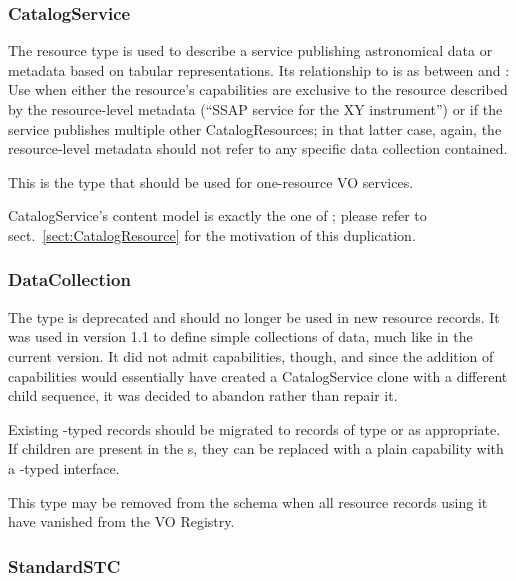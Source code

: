 \documentclass[11pt,a4paper]{ivoa}
\begin{document}


\subsubsection{CatalogService}

The  resource type is used to describe a
service publishing astronomical data or metadata based on tabular
representations.  Its relationship to 
is as between 
and : Use  when either
the resource's capabilities are exclusive to the resource described by
the resource-level metadata (``SSAP service for the XY instrument'') or
if the service publishes multiple other CatalogResources; in that latter
case, again, the resource-level metadata should not refer to any
specific data collection contained.

This is the type that should be used for one-resource VO
services.

CatalogService's content model is exactly the one of
; please refer to sect.~\ref{sect:CatalogResource}
for the motivation of this duplication.

\subsubsection{DataCollection}
\label{sect:datacollection}

The  type is deprecated and should no longer be
used in new resource records.  It was used in version 1.1 to define
simple collections of data, much like  in the
current version.  It did not admit capabilities, though, and since the
addition of capabilities would essentially have created a CatalogService
clone with a different child sequence, it was decided to abandon rather
than repair it.

Existing -typed
records should be migrated to records of type  or
 as appropriate.  If 
children are present in the
\/s,
they can be replaced with a plain capability with a
-typed interface.

This type may be removed from the schema when all resource records using
it have vanished from the VO Registry.

\subsubsection{StandardSTC}
\end{document}
